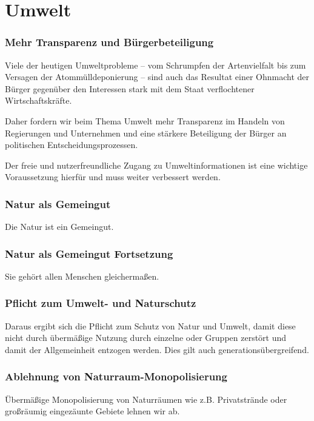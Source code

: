 \section{Umwelt}


\subsubsection{Mehr Transparenz und Bürgerbeteiligung}
\abstimmung
Viele der heutigen Umweltprobleme – vom Schrumpfen der Artenvielfalt bis zum Versagen der Atommülldeponierung – sind auch das Resultat einer Ohnmacht der Bürger gegenüber den Interessen stark mit dem Staat verflochtener Wirtschaftskräfte.

Daher fordern wir beim Thema Umwelt mehr Transparenz im Handeln von Regierungen und Unternehmen und eine stärkere Beteiligung der Bürger an politischen Entscheidungsprozessen.

Der freie und nutzerfreundliche Zugang zu Umweltinformationen ist eine wichtige Voraussetzung hierfür und muss weiter verbessert werden.
 

\subsubsection{Natur als Gemeingut}
\abstimmung
Die Natur ist ein Gemeingut.

\subsubsection{Natur als Gemeingut Fortsetzung}
\abstimmung
Sie gehört allen Menschen gleichermaßen.

\subsubsection{Pflicht zum Umwelt- und Naturschutz}
\abstimmung
Daraus ergibt sich die Pflicht zum Schutz von Natur und Umwelt, damit diese nicht durch übermäßige Nutzung durch einzelne oder Gruppen zerstört und damit der Allgemeinheit entzogen werden. Dies gilt auch generationsübergreifend.

\subsubsection{Ablehnung von Naturraum-Monopolisierung}
\abstimmung
Übermäßige Monopolisierung von Naturräumen wie z.B. Privatstrände oder großräumig eingezäunte Gebiete lehnen wir ab.


